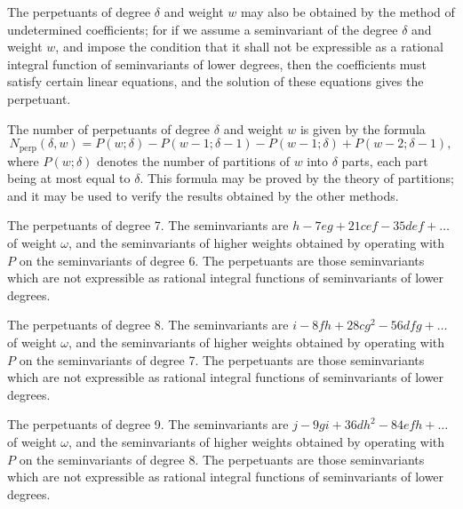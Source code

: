 \documentclass[11pt,a4paper]{book}
\begin{document}
\setcounter{art}{64}
\begin{art}
The perpetuants of degree $\delta$ and weight $w$ may also be obtained by the method of undetermined coefficients; for if we assume a seminvariant of the degree $\delta$ and weight $w$, and impose the condition that it shall not be expressible as a rational integral function of seminvariants of lower degrees, then the coefficients must satisfy certain linear equations, and the solution of these equations gives the perpetuant.
\end{art}

\setcounter{art}{65}
\begin{art}
The number of perpetuants of degree $\delta$ and weight $w$ is given by the formula
\[
N_{\text{perp}}(\delta, w) = P(w; \delta) - P(w - 1; \delta - 1) - P(w - 1; \delta) + P(w - 2; \delta - 1),
\]
where $P(w; \delta)$ denotes the number of partitions of $w$ into $\delta$ parts, each part being at most equal to $\delta$. This formula may be proved by the theory of partitions; and it may be used to verify the results obtained by the other methods.
\end{art}

\setcounter{art}{66}
\begin{art}
The perpetuants of degree 7. The seminvariants are $h - 7eg + 21cef - 35def + \ldots$ of weight $\omega$, and the seminvariants of higher weights obtained by operating with $P$ on the seminvariants of degree 6. The perpetuants are those seminvariants which are not expressible as rational integral functions of seminvariants of lower degrees.
\end{art}

\setcounter{art}{67}
\begin{art}
The perpetuants of degree 8. The seminvariants are $i - 8fh + 28cg^{2} - 56dfg + \ldots$ of weight $\omega$, and the seminvariants of higher weights obtained by operating with $P$ on the seminvariants of degree 7. The perpetuants are those seminvariants which are not expressible as rational integral functions of seminvariants of lower degrees.
\end{art}

\setcounter{art}{68}
\begin{art}
The perpetuants of degree 9. The seminvariants are $j - 9gi + 36dh^{2} - 84efh + \ldots$ of weight $\omega$, and the seminvariants of higher weights obtained by operating with $P$ on the seminvariants of degree 8. The perpetuants are those seminvariants which are not expressible as rational integral functions of seminvariants of lower degrees.
\end{art}
\end{document}
